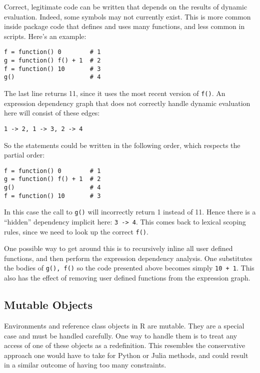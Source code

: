 \documentclass[12pt]{article}
\begin{document}
Correct, legitimate code can be written that depends on the results of
dynamic evaluation. Indeed, some symbols may not currently exist. This is
more common inside package code that defines and uses many functions, and
less common in scripts.  Here's an example:

\begin{verbatim}
f = function() 0        # 1
g = function() f() + 1  # 2
f = function() 10       # 3
g()                     # 4
\end{verbatim}

The last line returns 11, since it uses the most recent version of \texttt{f()}.
An expression dependency graph that does not correctly handle dynamic
evaluation here will consist of these edges:

\begin{verbatim}
1 -> 2, 1 -> 3, 2 -> 4
\end{verbatim}

So the statements could be written in the following order, which respects
the partial order:

\begin{verbatim}
f = function() 0        # 1
g = function() f() + 1  # 2
g()                     # 4
f = function() 10       # 3
\end{verbatim}

In this case the call to \texttt{g()} will incorrectly return 1 instead of 11.
Hence there is a ``hidden'' dependency implicit here: \texttt{3 -> 4}.
This comes back to lexical scoping rules, since we need to look up the
correct \texttt{f()}.

One possible way to get around this is to recursively inline all user
defined functions, and then perform the expression dependency analysis. One
substitutes the bodies of \texttt{g(), f()} so the code presented above
becomes simply \texttt{10 + 1}. This also has the effect of removing user
defined functions from the expression graph.

\subsection{Mutable Objects}

Environments and reference class objects in R are mutable. They are a
special case and must be handled carefully. One way to handle them is to
treat any access of one of these objects as a redefinition. This resembles
the conservative approach one would have to take for Python or Julia
methods, and could result in a similar outcome of having too many
constraints.
\end{document}
